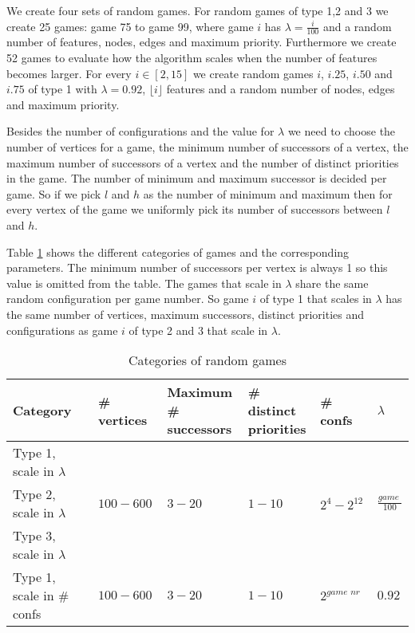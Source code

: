 We create four sets of random games. For random games of type 1,2 and 3 we create 25 games: game 75 to game 99, where game $i$ has $\lambda=\frac{i}{100}$ and a random number of features, nodes, edges and maximum priority. Furthermore we create 52 games to evaluate how the algorithm scales when the number of features becomes larger. For every $i \in [2,15]$ we create random games $i$, $i.25$, $i.50$ and $i.75$ of type 1 with $\lambda=0.92$, $\lfloor i\rfloor$ features and a random number of nodes, edges and maximum priority. 

Besides the number of configurations and the value for $\lambda$ we need to choose the number of vertices for a game, the minimum number of successors of a vertex, the maximum number of successors of a vertex and the number of distinct priorities in the game. The number of minimum and maximum successor is decided per game. So if we pick $l$ and $h$ as the number of minimum and maximum then for every vertex of the game we uniformly pick its number of successors between $l$ and $h$.

Table \ref{tab_random_games} shows the different categories of games and the corresponding parameters. The minimum number of successors per vertex is always 1 so this value is omitted from the table. The games that scale in $\lambda$ share the same random configuration per game number. So game $i$ of type 1 that scales in $\lambda$ has the same number of vertices, maximum successors, distinct priorities and configurations as game $i$ of type 2 and 3 that scale in $\lambda$.

\begin{table}
\centering
	\begin{tabular}{|l|l|l|l|l|l|}
		\hline
		Category & \# vertices & \shortstack{Maximum \\\# successors} & \shortstack{\# distinct\\priorities} & \# confs  & $\lambda$ \\ \hline
		Type 1, scale in $\lambda$ & & & & & \\ \cline{1-1}  
		Type 2, scale in $\lambda$ &$100-600$  & $3-20$                   & $1-10$                          & $2^{4}-2^{12}$ & $\frac{\textit{game nr}}{100}$            \\ \cline{1-1} 
		Type 3, scale in $\lambda$ & & & & & \\ \hline
		Type 1, scale in \# confs          & $100-600$            &  $3-20$                   & $1-10$                          & $2^\textit{game nr}$                & $0.92$                   \\ \hline
	\end{tabular}
\caption{Categories of random games}
	\label{tab_random_games}
\end{table}

